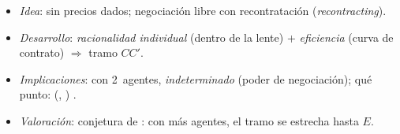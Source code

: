 \documentclass{article}
\begin{document}
\begin{columnas}
\begin{itemize}
\item \emph{Idea}: sin precios dados; negociación libre con recontratación (\emph{recontracting}).
\item \emph{Desarrollo}: \emph{racionalidad individual} (dentro de la lente) + \emph{eficiencia} (curva de contrato) $\Rightarrow$ tramo $CC'$.
\item \emph{Implicaciones}: con 2~agentes, \emph{indeterminado} (poder de negociación); qué punto:  (, ) .
\item \emph{Valoración}: conjetura de : con más agentes, el tramo se estrecha hasta $E$.
\end{itemize}


\end{columnas}
\end{document}
